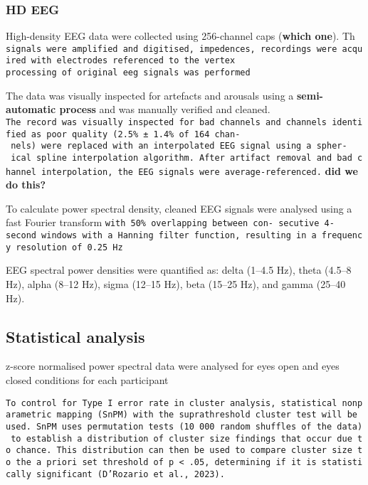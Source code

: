 \documentclass[
]{article}
\begin{document}
\subsubsection{HD EEG}\label{hd-eeg}

High-density EEG data were collected using 256-channel caps
(\textbf{which one}). Th
\texttt{signals\ were\ amplified\ and\ digitised,\ impedences,\ recordings\ were\ acquired\ with\ electrodes\ referenced\ to\ the\ vertex}
\texttt{processing\ of\ original\ eeg\ signals\ was\ performed}

The data was visually inspected for artefacts and arousals using a
\textbf{semi-automatic process} and was manually verified and cleaned.
\texttt{The\ record\ was\ visually\ inspected\ for\ bad\ channels\ and\ channels\ identified\ as\ poor\ quality\ (2.5\%\ ±\ 1.4\%\ of\ 164\ chan-\ nels)\ were\ replaced\ with\ an\ interpolated\ EEG\ signal\ using\ a\ spher-\ ical\ spline\ interpolation\ algorithm.\ After\ artifact\ removal\ and\ bad\ channel\ interpolation,\ the\ EEG\ signals\ were\ average-referenced.}
\textbf{did we do this?}

To calculate power spectral density, cleaned EEG signals were analysed
using a fast Fourier transform
\texttt{with\ 50\%\ overlapping\ between\ con-\ secutive\ 4-second\ windows\ with\ a\ Hanning\ filter\ function,\ resulting\ in\ a\ frequency\ resolution\ of\ 0.25\ Hz}

EEG spectral power densities were quantified as: delta (1--4.5 Hz),
theta (4.5--8 Hz), alpha (8--12 Hz), sigma (12--15 Hz), beta (15--25
Hz), and gamma (25--40 Hz).

\subsection{Statistical analysis}\label{statistical-analysis}

z-score normalised power spectral data were analysed for eyes open and
eyes closed conditions for each participant

\texttt{To\ control\ for\ Type\ I\ error\ rate\ in\ cluster\ analysis,\ statistical\ nonparametric\ mapping\ (SnPM)\ with\ the\ suprathreshold\ cluster\ test\ will\ be\ used.\ SnPM\ uses\ permutation\ tests\ (10\ 000\ random\ shuffles\ of\ the\ data)\ to\ establish\ a\ distribution\ of\ cluster\ size\ findings\ that\ occur\ due\ to\ chance.\ This\ distribution\ can\ then\ be\ used\ to\ compare\ cluster\ size\ to\ the\ a\ priori\ set\ threshold\ of\ p\ \textless{}\ .05,\ determining\ if\ it\ is\ statistically\ significant\ (D’Rozario\ et\ al.,\ 2023).}
\end{document}
